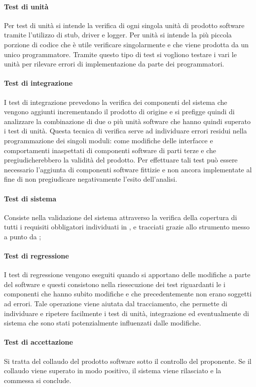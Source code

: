 \paragraph{Test di unità} 
Per test di unità si intende la verifica di ogni singola unità di prodotto software tramite l'utilizzo di stub, driver e logger. Per unità si intende la più piccola porzione di codice che è utile verificare singolarmente e che viene prodotta da un unico programmatore. Tramite questo tipo di test si vogliono testare i vari le unità per rilevare errori di implementazione da parte dei programmatori.

\paragraph{Test di integrazione}
I test di integrazione prevedono la verifica dei componenti del sistema che vengono aggiunti incrementando il prodotto di origine e si prefigge quindi di analizzare la combinazione di due o più unità software che hanno quindi superato i test di unità. Questa tecnica di verifica serve ad individuare errori residui nella programmazione dei singoli moduli: come modifiche delle interfacce e comportamenti inaspettati di componenti software di parti terze e che pregiudicherebbero la validità del prodotto. Per effettuare tali test può essere necessario l'aggiunta di componenti software fittizie e non ancora implementate al fine di non pregiudicare negativamente l'esito dell'analisi.
\paragraph{Test di sistema}
Consiste nella validazione del sistema attraverso la verifica della copertura di tutti i requisiti obbligatori individuati in \infoAR, e tracciati  grazie allo strumento messo a punto da \gruppo;
\paragraph{Test di regressione}
I test di regressione vengono eseguiti quando si apportano delle modifiche a parte del software e questi consistono nella riesecuzione dei test riguardanti le i componenti che hanno subito modifiche e che precedentemente non erano soggetti ad errori.
Tale operazione viene aiutata dal tracciamento, che permette di individuare e ripetere facilmente i test di unità, integrazione ed eventualmente di sistema che sono stati potenzialmente influenzati dalle modifiche.
\paragraph{Test di accettazione}
Si tratta del collaudo del prodotto software sotto il controllo del proponente. Se il collaudo viene superato in modo positivo, il sistema viene rilasciato e la commessa si conclude.

